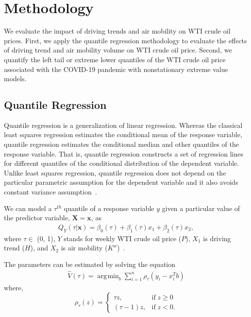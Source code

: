 \documentclass[review]{elsarticle}
\DeclareMathOperator*{\argmin}{\arg\!\min}
\begin{document}

\section{Methodology}
\label{sec:Meth}

We evaluate the impact of driving trends and air mobility on WTI crude oil prices. First, we apply the quantile regression methodology to evaluate the effects of driving trend and air mobility volume on WTI crude oil price.
Second, we quantify the left tail or extreme lower quantiles of the WTI crude oil price associated with the COVID-19 pandemic with nonstationary extreme value models.



\subsection{Quantile Regression}


Quantile regression is a generalization of linear regression.
Whereas the classical least squares regression estimates the conditional mean of the response variable, quantile regression estimates the conditional median and other quantiles of the response variable. That is, quantile regression constructs a set of regression lines for different quantiles of the conditional distribution of the dependent variable.
Unlike least squares regression, quantile regression does not depend on the particular parametric assumption for the dependent variable and it also avoids constant variance assumption~\citep{Fasiolo2020,Koenker2001,Koenker2002,Nicolai2006}.

We can model a $\tau^{th}$ quantile of a response variable $y$ given a particular value of the predictor variable, $\mathbf{X}=\mathbf{x}$, as 
\begin{eqnarray}\label{eq:QR}
Q_Y (\tau|\mathbf{x}) = \beta_0(\tau)  + \beta_1(\tau) x_1 + \beta_2(\tau) x_2,
\end{eqnarray}
where $\tau\in$ (0, 1), $Y$ stands for weekly WTI crude oil price ($P$), $X_{1}$ is driving trend ($H$), and $X_{2}$ is air mobility ($K^w$)~\citep{koenker_2005}. 




The parameters can be estimated by solving the equation
\begin{eqnarray}\label{eq:LF1}\nonumber
\hat{V} (\tau) = \argmin_{b} \sum\limits_{i=1}^n \rho_\tau (y_i - x_i^T b) 
\end{eqnarray}
where, 
\begin{equation}\nonumber
\rho_\tau (z) =\begin{cases} \tau z, & \mbox{if}\; z \geq 0 \\
(\tau - 1) z, & \mbox{if}\;  z < 0.
\end{cases}
\end{equation}
\end{document}
